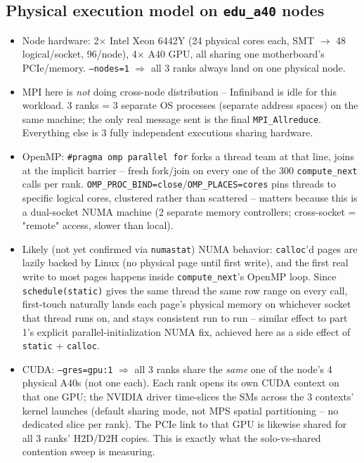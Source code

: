 \subsection{Physical execution model on \texttt{edu\_a40} nodes}
\begin{itemize}
\item Node hardware: 2$\times$ Intel Xeon 6442Y (24 physical cores each, SMT $\to$ 48 logical/socket, 96/node), 4$\times$ A40 GPU, all sharing one motherboard's PCIe/memory. \texttt{--nodes=1} $\Rightarrow$ all 3 ranks always land on one physical node.
\item MPI here is \emph{not} doing cross-node distribution -- Infiniband is idle for this workload. 3 ranks = 3 separate OS processes (separate address spaces) on the same machine; the only real message sent is the final \texttt{MPI\_Allreduce}. Everything else is 3 fully independent executions sharing hardware.
\item OpenMP: \texttt{\#pragma omp parallel for} forks a thread team at that line, joins at the implicit barrier -- fresh fork/join on every one of the 300 \texttt{compute\_next} calls per rank. \texttt{OMP\_PROC\_BIND=close}/\texttt{OMP\_PLACES=cores} pins threads to specific logical cores, clustered rather than scattered -- matters because this is a dual-socket NUMA machine (2 separate memory controllers; cross-socket = "remote" access, slower than local).
\item Likely (not yet confirmed via \texttt{numastat}) NUMA behavior: \texttt{calloc}'d pages are lazily backed by Linux (no physical page until first write), and the first real write to most pages happens inside \texttt{compute\_next}'s OpenMP loop. Since \texttt{schedule(static)} gives the same thread the same row range on every call, first-touch naturally lands each page's physical memory on whichever socket that thread runs on, and stays consistent run to run -- similar effect to part 1's explicit parallel-initialization NUMA fix, achieved here as a side effect of \texttt{static} + \texttt{calloc}.
\item CUDA: \texttt{--gres=gpu:1} $\Rightarrow$ all 3 ranks share the \emph{same} one of the node's 4 physical A40s (not one each). Each rank opens its own CUDA context on that one GPU; the NVIDIA driver time-slices the SMs across the 3 contexts' kernel launches (default sharing mode, not MPS spatial partitioning -- no dedicated slice per rank). The PCIe link to that GPU is likewise shared for all 3 ranks' H2D/D2H copies. This is exactly what the solo-vs-shared contention sweep is measuring.
\end{itemize}

